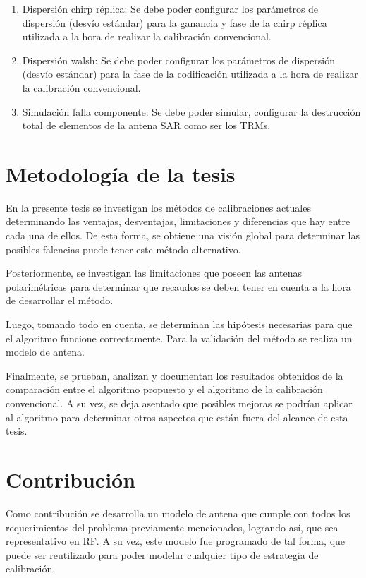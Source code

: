 \begin{enumerate}
    \item Dispersión chirp réplica: Se debe poder configurar los parámetros de dispersión (desvío estándar) para la 
		ganancia y fase de la chirp réplica utilizada a la hora de realizar la calibración convencional.
    
    \item Dispersión walsh: Se debe poder configurar los parámetros de dispersión (desvío estándar) para la fase de la 
		codificación utilizada a la hora de realizar la calibración convencional.

    \item Simulación falla componente: Se debe poder simular, configurar la destrucción total de elementos de la antena SAR 
		como ser los TRMs.
\end{enumerate}


\section{Metodología de la tesis}
En la presente tesis se investigan los métodos de calibraciones actuales determinando las ventajas, desventajas, 
limitaciones y diferencias que hay entre cada una de ellos. De esta forma, se obtiene una visión global para 
determinar las posibles falencias puede tener este método alternativo.

Posteriormente, se investigan las limitaciones que poseen las antenas polarimétricas para determinar que recaudos 
se deben tener en cuenta a la hora de desarrollar el método.

Luego, tomando todo en cuenta, se determinan las hipótesis necesarias para que el algoritmo funcione correctamente. Para 
la validación del método se realiza un modelo de antena.

Finalmente, se prueban, analizan y documentan los resultados obtenidos de la comparación entre el algoritmo propuesto 
y el algoritmo de la calibración convencional. A su vez, se deja asentado que posibles mejoras se podrían aplicar al 
algoritmo para determinar otros aspectos que están fuera del alcance de esta tesis.

\section{Contribución}

Como contribución se desarrolla un modelo de antena que cumple con todos los requerimientos del problema previamente 
mencionados, logrando así, que sea representativo en RF. A su vez, este modelo fue programado de tal forma, que puede
ser reutilizado para poder modelar cualquier tipo de estrategia de calibración.


